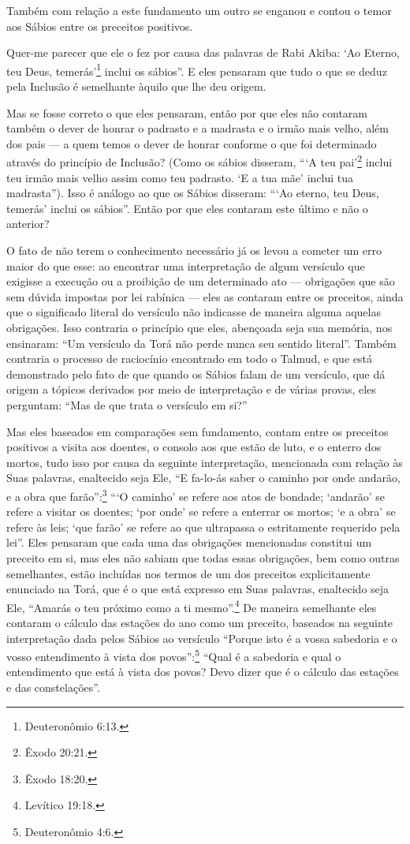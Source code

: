 Também com relação a este fundamento um outro se enganou e contou o
temor aos Sábios entre os preceitos positivos.

Quer-me parecer que ele o fez por causa das palavras de Rabi Akiba: `Ao
Eterno, teu Deus, temerás'\footnote{Deuteronômio 6:13.} inclui os sábios''. E
eles pensaram que tudo o que se deduz pela Inclusão é semelhante àquilo
que lhe deu origem.

Mas se fosse correto o que eles pensaram, então por que eles não
contaram também o dever de honrar o padrasto e a madrasta e o irmão mais
velho, além dos pais --- a quem temos o dever de honrar conforme o que
foi determinado através do princípio de Inclusão? (Como os sábios
disseram, ```A teu pai'\footnote{Êxodo 20:21.} inclui teu irmão mais velho assim
como teu padrasto. `E a tua mãe' inclui tua madrasta''). Isso é análogo
ao que os Sábios disseram: ```Ao eterno, teu Deus, temerás' inclui os
sábios''. Então por que eles contaram este último e não o anterior?

O fato de não terem o conhecimento necessário já os levou a cometer um
erro maior do que esse: ao encontrar uma interpretação de algum
versículo que exigisse a execução ou a proibição de um determinado ato
--- obrigações que são sem dúvida impostas por lei rabínica --- eles as
contaram entre os preceitos, ainda que o significado literal do
versículo não indicasse de maneira alguma aquelas obrigações. Isso
contraria o princípio que eles, abençoada seja sua memória, nos
ensinaram: ``Um versículo da Torá não perde nunca seu sentido
literal''. Também contraria o processo de raciocínio encontrado em todo
o Talmud, e que está demonstrado pelo fato de que quando os Sábios falam
de um versículo, que dá origem a tópicos derivados por meio de
interpretação e de várias provas, eles perguntam: ``Mas de que trata o
versículo em si?''

Mas eles baseados em comparações sem fundamento, contam entre os
preceitos positivos a visita aos doentes, o consolo aos que estão de
luto, e o enterro dos mortos, tudo isso por causa da seguinte
interpretação, mencionada com relação às Suas palavras, enaltecido seja
Ele, ``E fa-lo-ás saber o caminho por onde andarão, e a obra que
farão'':\footnote{Êxodo 18:20.} ```O caminho' se refere aos atos de bondade;
`andarão' se refere a visitar os doentes; `por onde' se refere a
enterrar os mortos; `e a obra' se refere às leis; `que farão' se refere
ao que ultrapassa o estritamente requerido pela lei''. Eles pensaram que
cada uma das obrigações mencionadas constitui um preceito em si, mas
eles não sabiam que todas essas obrigações, bem como outras
semelhantes, estão incluídas nos termos de um dos preceitos
explicitamente enunciado na Torá, que é o que está expresso em Suas
palavras, enaltecido seja Ele, ``Amarás o teu próximo como a ti mesmo''.\footnote{Levítico 19:18.} De maneira semelhante eles contaram o cálculo das
estações do ano como um preceito, baseados na seguinte interpretação
dada pelos Sábios ao versículo ``Porque isto é a vossa sabedoria e o
vosso entendimento à vista dos povos'':\footnote{Deuteronômio 4:6.} ``Qual é a
sabedoria e qual o entendimento que está à vista dos povos? Devo dizer
que é o cálculo das estações e das constelações''.

